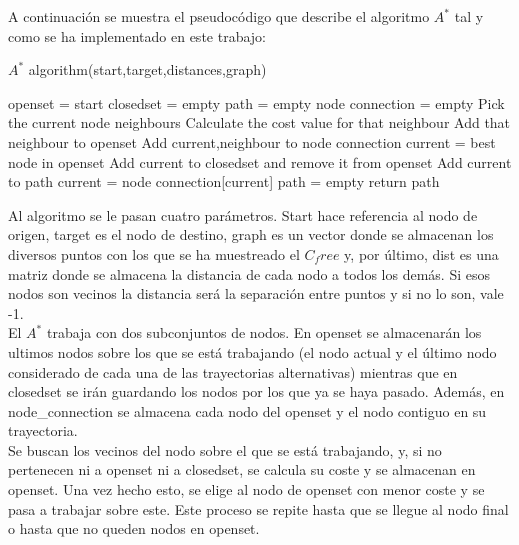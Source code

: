 A continuación se muestra el pseudocódigo que describe el algoritmo $A^*$ tal y como se ha implementado en este trabajo:\\

\begin{algorithm}
\caption{$A^*$ algorithm(start,target,distances,graph)}\label{A_algorithm}
\begin{algorithmic}[1]
\State openset = start
\State closedset = empty
\State path = empty
\State node connection = empty
 		\State Pick the current node neighbours
 			\State Calculate the cost value for that neighbour
 			\State Add that neighbour to openset
 			\State Add current,neighbour to node connection
 		\EndIf
	\EndFor
	\State current = best node in openset
	\State Add current to closedset and remove it from openset
	\EndWhile
				\State Add current to path
				\State current = node connection[current]
			\EndWhile
		\Else
			\State path = empty
		\EndIf
	\State return path
\end{algorithmic}
\end{algorithm}  

Al algoritmo se le pasan cuatro parámetros. Start hace referencia al nodo de origen, target es el nodo de destino, graph es un vector donde se almacenan los diversos puntos con los que se ha muestreado el $C_free$ y, por último, dist es una matriz donde se almacena la distancia de cada nodo a todos los demás. Si esos nodos son vecinos la distancia será la separación entre puntos y si no lo son, vale -1.\\

El $A^*$ trabaja con dos subconjuntos de nodos. En openset se almacenarán los ultimos nodos sobre los que se está trabajando (el nodo actual y el último nodo considerado de cada una de las trayectorias alternativas) mientras que en closedset se irán guardando los nodos por los que ya se haya pasado. Además, en node\_connection se almacena cada nodo del openset y el nodo contiguo en su trayectoria.\\

Se buscan los vecinos del nodo sobre el que se está trabajando, y, si no pertenecen ni a openset ni a closedset, se calcula su coste y se almacenan en openset. Una vez hecho esto, se elige al nodo de openset con menor coste y se pasa a trabajar sobre este. Este proceso se repite hasta que se llegue al nodo final o hasta que no queden nodos en openset.\\

